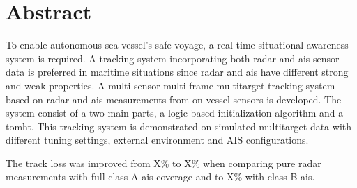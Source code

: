 
\section*{\huge Abstract}
\hfill
\noindent

To enable autonomous sea vessel's safe voyage, a real time situational awareness system is required. A tracking system incorporating both radar and \gls{ais} sensor data is preferred in maritime situations since radar and \gls{ais} have different strong and weak properties. A multi-sensor multi-frame multitarget tracking system based on radar and \gls{ais} \glspl{measurement} from on vessel sensors is developed. The system consist of a two main parts, a logic based initialization algorithm and a \gls{tomht}. This tracking system is demonstrated on simulated multitarget data with different tuning settings, external environment and AIS configurations.

The track loss was improved from X\% to X\% when comparing pure radar measurements with full class A \gls{ais} coverage and to X\% with class B \gls{ais}.